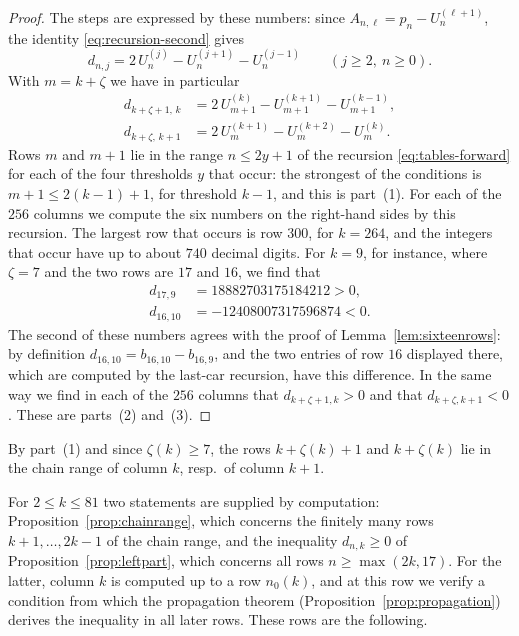 \documentclass{amsart}
\makeatletter
\theoremstyle{definition}
\theoremstyle{remark}
\numberwithin{equation}{section}
\def\subsection{\@startsection{subsection}{2}\z@{.5\linespacing\@plus.7\linespacing}{-.5em}{\normalfont\bfseries\boldmath}}
\makeatother
\begin{document}
\begin{proof}
The steps are expressed by these numbers: since $A_{n,\ell}=p_n-U^{(\ell+1)}_n$, the identity \eqref{eq:recursion-second} gives
\[
d_{n,j}=2\,U^{(j)}_n-U^{(j+1)}_n-U^{(j-1)}_n\qquad(j\ge 2,\ n\ge 0).
\]
With $m=k+\zeta$ we have in particular
\begin{align*}
d_{k+\zeta+1,\,k}&=2\,U^{(k)}_{m+1}-U^{(k+1)}_{m+1}-U^{(k-1)}_{m+1},\\
d_{k+\zeta,\,k+1}&=2\,U^{(k+1)}_{m}-U^{(k+2)}_{m}-U^{(k)}_{m}.
\end{align*}
Rows $m$ and $m+1$ lie in the range $n\le 2y+1$ of the recursion \eqref{eq:tables-forward} for each of the four thresholds $y$ that occur: the strongest of the conditions is $m+1\le 2(k-1)+1$, for threshold $k-1$, and this is part~(1). For each of the $256$ columns we compute the six numbers on the right-hand sides by this recursion. The largest row that occurs is row $300$, for $k=264$, and the integers that occur have up to about $740$ decimal digits. For $k=9$, for instance, where $\zeta=7$ and the two rows are $17$ and $16$, we find that
\begin{align*}
d_{17,9}&=18882703175184212>0,\\
d_{16,10}&=-12408007317596874<0.
\end{align*}
The second of these numbers agrees with the proof of Lemma~\ref{lem:sixteenrows}: by definition $d_{16,10}=b_{16,10}-b_{16,9}$, and the two entries of row $16$ displayed there, which are computed by the last-car recursion, have this difference. In the same way we find in each of the $256$ columns that $d_{k+\zeta+1,k}>0$ and that $d_{k+\zeta,k+1}<0$. These are parts~(2) and~(3).
\end{proof}

By part~(1) and since $\zeta(k)\ge 7$, the rows $k+\zeta(k)+1$ and $k+\zeta(k)$ lie in the chain range of column $k$, resp.\ of column $k+1$.

\subsection{Columns $2$ to $81$}\label{subsec:tables-columns}

For $2\le k\le 81$ two statements are supplied by computation: Proposition~\ref{prop:chainrange}, which concerns the finitely many rows $k+1,\dots,2k-1$ of the chain range, and the inequality $d_{n,k}\ge 0$ of Proposition~\ref{prop:leftpart}, which concerns all rows $n\ge\max(2k,17)$. For the latter, column $k$ is computed up to a row $n_0(k)$, and at this row we verify a condition from which the propagation theorem (Proposition~\ref{prop:propagation}) derives the inequality in all later rows. These rows are the following.
\end{document}

